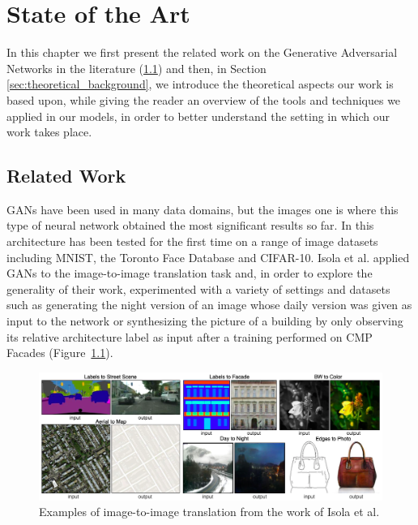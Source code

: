 \chapter{State of the Art}
\label{cha:2nd_chapter}
In this chapter we first present the related work on the Generative Adversarial Networks in the literature (\ref{sec:related_work}) and then, in Section \ref{sec:theoretical_background}, we introduce the theoretical aspects our work is based upon, while giving the reader an overview of the tools and techniques we applied in our models, in order to better understand the setting in which our work takes place.

\section{Related Work}
\label{sec:related_work}
\ac{GAN}s have been used in many data domains, but the images one is where this type of neural network obtained the most significant results so far. In \cite{gan} this architecture has been tested for the first time on a range of image datasets including MNIST\cite{lecun}, the Toronto Face Database\cite{tfd} and CIFAR-10\cite{cifar}. Isola et al. applied \ac{GAN}s to the image-to-image translation task and, in order to explore the generality of their work\cite{pix2pix}, experimented with a variety of settings and datasets such as generating the night version of an image whose daily version was given as input to the network or synthesizing the picture of a building by only observing its relative architecture label as input after a training performed on CMP Facades 
(Figure~\ref{fig:first_figure}).
\begin{figure}[htbp!]
\centering
\includegraphics[height=0.235\textheight]{images/pix2pix}
\caption[Pix2Pix example from Isola et al.]{Examples of image-to-image translation from the work of Isola et al. \cite{pix2pix}}
\label{fig:first_figure}
\end{figure}
